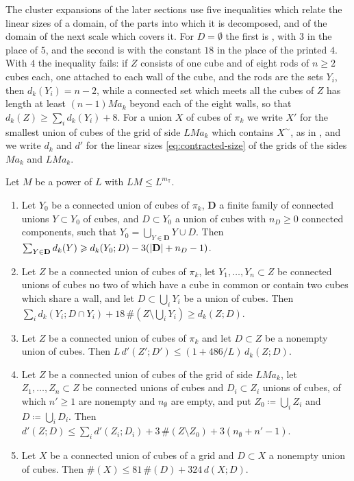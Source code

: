 \documentclass[11pt]{preprint}
\DeclarePairedDelimiter{\abs}{\lvert}{\rvert}
\numberwithin{equation}{section}
\begin{document}
The cluster expansions of the later sections use five inequalities which relate the linear sizes of a domain, of the parts into which it is decomposed, and of the domain of the next scale which covers it. For $D = \emptyset$ the first is \cite[(2.27), p.~18]{BalabanRG2}, with $3$ in the place of $5$, and the second is \cite[(2.32), p.~18]{BalabanRG2} with the constant $18$ in the place of the printed $4$. With $4$ the inequality fails: if $Z$ consists of one cube and of eight rods of $n \geqslant 2$ cubes each, one attached to each wall of the cube, and the rods are the sets $Y_i$, then $d_k(Y_i) = n - 2$, while a connected set which meets all the cubes of $Z$ has length at least $(n - 1)Ma_k$ beyond each of the eight walls, so that $d_k(Z) \geqslant \sum_id_k(Y_i) + 8$. For a union $X$ of cubes of $\pi_k$ we write $X'$ for the smallest union of cubes of the grid of side $LMa_k$ which contains $X^\sim$, as in \cite[p.~13]{BalabanRG2}, and we write $d_k$ and $d'$ for the linear sizes \eqref{eq:contracted-size} of the grids of the sides $Ma_k$ and $LMa_k$.

\begin{lemma}\label{lem:contracted-geometry}
Let $M$ be a power of $L$ with $LM \leqslant L^{m_{\mathbb T}}$.
\begin{enumerate}[label=(\roman*)]
\item Let $Y_0$ be a connected union of cubes of $\pi_k$, $\mathbf D$ a finite family of connected unions $Y \subset Y_0$ of cubes, and $D \subset Y_0$ a union of cubes with $n_D \geqslant 0$ connected components, such that $Y_0 = \bigcup_{Y \in \mathbf D}Y \cup D$. Then $\sum_{Y \in \mathbf D}d_k(Y) \geqslant d_k(Y_0; D) - 3(\abs{\mathbf D} + n_D - 1)$.
\item Let $Z$ be a connected union of cubes of $\pi_k$, let $Y_1, \dots, Y_n \subset Z$ be connected unions of cubes no two of which have a cube in common or contain two cubes which share a wall, and let $D \subset \bigcup_iY_i$ be a union of cubes. Then $\sum_id_k(Y_i; D \cap Y_i) + 18\,\#(Z \setminus \bigcup_iY_i) \geqslant d_k(Z; D)$.
\item Let $Z$ be a connected union of cubes of $\pi_k$ and let $D \subset Z$ be a nonempty union of cubes. Then $L\,d'(Z'; D') \leqslant (1 + 486/L)\,d_k(Z; D)$.
\item Let $Z$ be a connected union of cubes of the grid of side $LMa_k$, let $Z_1, \dots, Z_n \subset Z$ be connected unions of cubes and $D_i \subset Z_i$ unions of cubes, of which $n' \geqslant 1$ are nonempty and $n_\emptyset$ are empty, and put $Z_0 \coloneqq \bigcup_iZ_i$ and $D \coloneqq \bigcup_iD_i$. Then $d'(Z; D) \leqslant \sum_id'(Z_i; D_i) + 3\,\#(Z \setminus Z_0) + 3(n_\emptyset + n' - 1)$.
\item Let $X$ be a connected union of cubes of a grid and $D \subset X$ a nonempty union of cubes. Then $\#(X) \leqslant 81\,\#(D) + 324\,d(X; D)$.
\end{enumerate}
\end{lemma}
\end{document}
